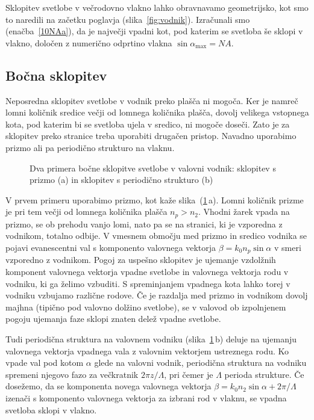 \begin{remark}
Sklopitev svetlobe v večrodovno vlakno lahko obravnavamo geometrijsko, kot smo to naredili
na začetku poglavja (slika~\ref{fig:vodnik}). Izračunali smo (enačba~\ref{10NAa}), da je največji 
vpadni kot, pod katerim se svetloba še sklopi v vlakno, določen z numerično odprtino 
vlakna $\sin \alpha_{\mathrm{max}}= NA$.
\end{remark}

\subsection*{Bočna sklopitev}
Neposredna sklopitev svetlobe v vodnik preko plašča ni mogoča. Ker je namreč lomni količnik
sredice večji od lomnega količnika plašča, dovolj velikega vstopnega kota, pod katerim bi 
se svetloba ujela v sredico, ni mogoče doseči. Zato je za sklopitev preko stranice treba 
uporabiti drugačen pristop. Navadno uporabimo prizmo ali pa periodično strukturo na vlaknu. 

\begin{figure}[h]
\centering
\def\svgwidth{120truemm} 
 
\caption{Dva primera bočne sklopitve svetlobe v valovni vodnik: sklopitev s prizmo (a) in sklopitev
s periodično strukturo (b)}
\label{fig:coupler}
\end{figure}
V prvem primeru uporabimo prizmo, kot kaže slika~(\ref{fig:coupler}\,a). Lomni količnik prizme
je pri tem večji od lomnega količnika plašča $n_p > n_2$.
Vhodni žarek vpada na prizmo, se ob prehodu vanjo lomi, nato pa se na stranici, ki je vzporedna
z vodnikom, totalno odbije. 
V vmesnem območju med prizmo in sredico vodnika se pojavi evanescentni
val s komponento valovnega vektorja $\beta  = k_0 n_p \sin \alpha$ v 
smeri vzporedno z vodnikom. Pogoj za uspešno 
sklopitev je ujemanje vzdolžnih komponent valovnega vektorja vpadne svetlobe in valovnega
vektorja rodu v vodniku, ki ga želimo vzbuditi. 
S spreminjanjem vpadnega kota lahko torej v vodniku vzbujamo različne rodove. 
Če je razdalja med prizmo in vodnikom dovolj majhna (tipično pod valovno dolžino svetlobe), se v 
valovod ob izpolnjenem pogoju ujemanja faze sklopi znaten delež vpadne svetlobe.

Tudi periodična struktura na valovnem vodniku (slika~\ref{fig:coupler}\,b) deluje na 
ujemanju valovnega vektorja vpadnega vala z valovnim vektorjem ustreznega rodu.
Ko vpade val pod kotom $\alpha$ glede na valovni vodnik, periodična struktura na vodniku 
spremeni njegovo fazo za večkratnik $2 \pi z/\Lambda$, pri čemer je $\Lambda$ perioda strukture.
Če dosežemo, da se komponenta novega valovnega vektorja $\beta = k_0 n_2 \sin \alpha+ 
2 \pi/\Lambda$ izenači s  komponento valovnega vektorja za izbrani rod v vlaknu, 
se vpadna svetloba sklopi v vlakno.


